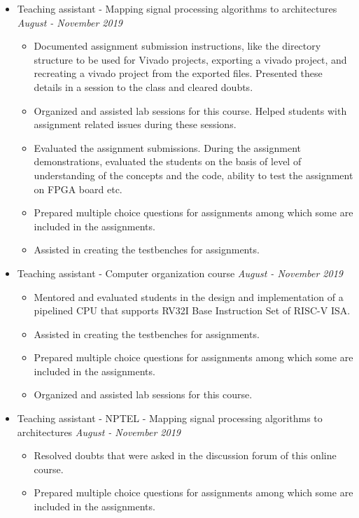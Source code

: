 \documentclass[a4paper,11pt]{article}
\newcommand{\isep}{-2 pt}
\newcommand{\spsep}{-0.75cm}
\begin{document}
\begin{itemize}
	\item Teaching assistant - Mapping signal processing algorithms to architectures \hfill \emph{August - November 2019} \\[\spsep]
	\begin{itemize} \itemsep \isep
		\item Documented assignment submission instructions, like the directory structure to be used for Vivado projects, exporting a vivado project, and recreating a vivado project from the exported files. Presented these details in a session to the class and cleared doubts.
		\item Organized and assisted lab sessions for this course. Helped students with assignment related issues during these sessions.
		\item Evaluated the assignment submissions. During the assignment demonstrations, evaluated the students on the basis of level of understanding of the concepts and the code, ability to test the assignment on FPGA board etc.
		\item Prepared multiple choice questions for assignments among which some are included in the assignments.
		\item Assisted in creating the testbenches for assignments.
	\end{itemize}
	
	\item Teaching assistant - Computer organization course \hfill \emph{August - November 2019} \\[\spsep]
	\begin{itemize} \itemsep \isep
		\item Mentored and evaluated students in the design and implementation of a pipelined CPU that supports RV32I Base Instruction Set of RISC-V ISA.
		\item Assisted in creating the testbenches for assignments.
		\item Prepared multiple choice questions for assignments among which some are included in the assignments.
		\item Organized and assisted lab sessions for this course.	
	\end{itemize}
	
	\item Teaching assistant - NPTEL - Mapping signal processing algorithms to architectures \hfill \emph{August - November 2019} \\[\spsep]
	\begin{itemize} \itemsep \isep
		\item Resolved doubts that were asked in the discussion forum of this online course.
		\item Prepared multiple choice questions for assignments among which some are included in the assignments.
	\end{itemize}
	

\end{itemize}
\end{document}
